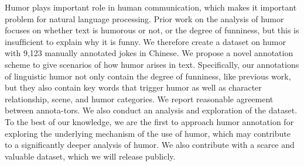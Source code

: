 Humor plays important role in human communication, which makes it important problem for natural language processing. Prior work on the analysis of humor focuses on whether text is humorous or not, or the degree of funniness, but this is insufﬁcient to explain why it is funny. We therefore create a dataset on humor with 9,123 manually annotated jokes in Chinese. We propose a novel annotation scheme to give scenarios of how humor arises in text. Speciﬁcally, our annotations of linguistic humor not only contain the degree of funniness, like previous work, but they also contain key words that trigger humor as well as character relationship, scene, and humor categories. We report reasonable agreement between annota-tors. We also conduct an analysis and exploration of the dataset. To the best of our knowledge, we are the ﬁrst to approach humor annotation for exploring the underlying mechanism of the use of humor, which may contribute to a signiﬁcantly deeper analysis of humor. We also contribute with a scarce and valuable dataset, which we will release publicly.